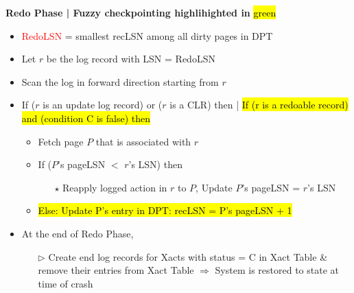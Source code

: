 \documentclass[10pt,landscape]{article}
\newcommand{\1}{\mathmybb{1}}
\begin{document}
\begin{multicols*}{3}
\textbf{Redo Phase | Fuzzy checkpointing highlihighted in} \hl{green}
\begin{itemize}
    \item \textcolor{red}{RedoLSN} = smallest recLSN among all dirty pages in DPT
    \item Let $r$ be the log record with LSN = RedoLSN
    \item Scan the log in forward direction starting from $r$
    \item If ($r$ is an update log record) or ($r$ is a CLR) then | \hl{If (r is a redoable record) and (condition C is false) then} 
    \begin{itemize}
        \item Fetch page $P$ that is associated with $r$
        \item If ($P$'s pageLSN $<$ $r$'s LSN) then
        \begin{itemize}
            \item[$\star$] Reapply logged action in $r$ to $P$, Update $P$'s pageLSN = $r$'s LSN
        \end{itemize}
        \item {}\hl{Else: Update P's entry in DPT: recLSN = P's pageLSN + 1}
    \end{itemize}
    \item At the end of Redo Phase,
    \begin{itemize}
        \item[$\triangleright$] Create end log records for Xacts with status = C in Xact Table \& remove their entries from Xact Table $\Rightarrow$ System is restored to state at time of crash
    \end{itemize}
\end{itemize}


\end{multicols*}
\end{document}
